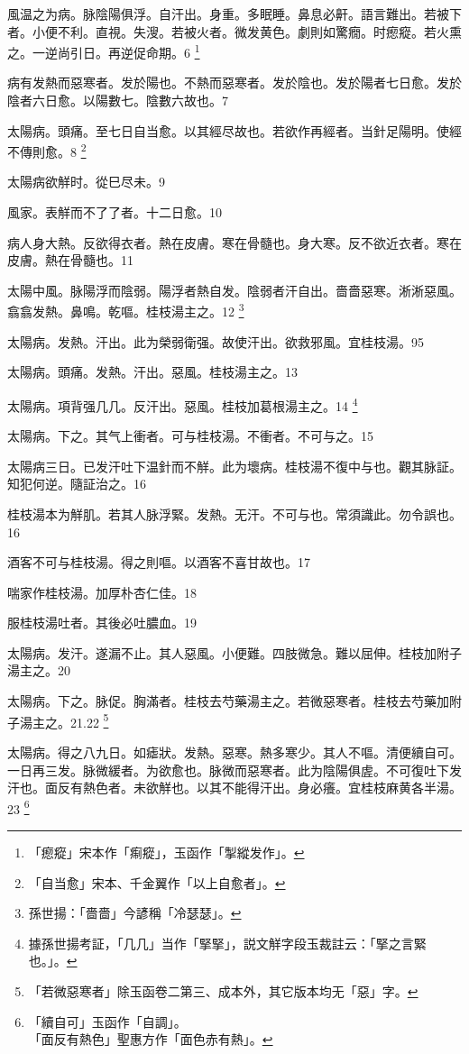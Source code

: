 \documentclass[12pt,twoside,UTF8,b5paper]{ctexbook}
\begin{document}
風温{之}为病。脉陰陽俱浮。自汗出。身重。多眠睡。鼻息必鼾。語言難出。若被下者。小便不利。直視。失溲。若被火者。微发黄{色}。劇則如驚癇。时瘛瘲。若火熏之。一逆尚引日。再逆促命期。6
	\footnote{「瘛瘲」宋本作「痸瘲」，玉函作「掣縱发作」。}

病有发熱而惡寒者。发於陽也。不熱而惡寒者。发於陰也。发於陽者七日愈。发於陰者六日愈。以陽數七。陰數六故也。7

太陽病。頭痛。至七日自当愈。以其經尽故也。若欲作再經者。当針足陽明。使經不傳則愈。8
	\footnote{「自当愈」宋本、千金翼作「以上自愈者」。}

太陽病欲觧时。從巳尽未。9

風家。表觧而不了了者。十二日愈。10

病人身大熱。反欲得衣者。熱在皮膚。寒在骨髓也。身大寒。反不欲近衣者。寒在皮膚。熱在骨髓也。11

太陽中風。{脉}陽浮而陰弱。陽浮者熱自发。陰弱者汗自出。嗇嗇惡寒。淅淅惡風。翕翕发熱。鼻鳴。乾嘔。桂枝湯主之。12
	\footnote{孫世揚：「嗇嗇」今諺稱「冷瑟瑟」。}

太陽病。发熱。汗出。此为榮弱衛强。故使汗出。欲救邪風。宜桂枝湯。95

太陽病。頭痛。发熱。汗出。惡風。桂枝湯主之。13

太陽病。項背强几几。反汗出。惡風。桂枝{加葛根}湯主之。14
	\footnote{據孫世揚考証，「几几」当作「掔掔」，説文觧字段玉裁註云：「掔之言緊也。」。}

太陽病。下之。其气上衝者。可与桂枝湯。不衝者。不可与之。15

太陽病三日。已发汗吐下温針而不觧。此为壞病。桂枝湯不復中与也。觀其脉証。知犯何逆。隨証治之。16

桂枝湯本为觧肌。若其人脉浮緊。发熱。无汗。不可与也。常須識此。勿令誤也。16

酒客不可与桂枝湯。得之則嘔。以酒客不喜甘故也。17

喘家作桂枝湯。加厚朴杏仁佳。18

服桂枝湯吐者。其後必吐膿血。19

太陽病。发汗。遂漏不止。其人惡風。小便難。四肢微急。難以屈伸。桂枝加附子湯主之。20

太陽病。下之。脉促。胸滿者。桂枝去芍藥湯主之。若微{惡}寒者。桂枝去芍藥加附子湯主之。21.22
	\footnote{「若微惡寒者」除玉函卷二第三、成本外，其它版本均无「惡」字。}


太陽病。得之八九日。如瘧狀。发熱。惡寒。熱多寒少。其人不嘔。清便續自可。一日再三发。脉微緩者。为欲愈也。脉微而惡寒者。此为陰陽俱虗。不可復{吐下}发汗也。面反有熱色者。未欲觧也。以其不能得汗出。身必癢。宜桂枝麻黄各半湯。23
	\footnote{「續自可」玉函作「自調」。\\「面反有熱色」聖惠方作「面色赤有熱」。}
\end{document}
